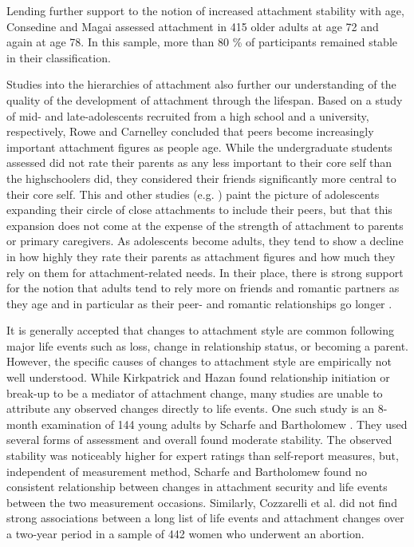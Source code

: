 \documentclass[12pt]{report}
\begin{document}
Lending further support to the notion of increased attachment stability with age, Consedine and Magai assessed attachment in 415 older adults at age 72 and again at age 78. In this sample, more than 80 \% of participants remained stable in their classification.

Studies into the hierarchies of attachment also further our understanding of the quality of the development of attachment through the lifespan.
Based on a study of mid- and late-adolescents recruited from a high school and a university, respectively, Rowe and Carnelley \cite{Rowe2005} concluded that peers become increasingly important attachment figures as people age. While the undergraduate students assessed did not rate their parents as any less important to their core self than the highschoolers did, they considered their friends significantly more central to their core self.
This and other studies (e.g. \cite{Fraley1997,Doherty2004}) paint the picture of adolescents expanding their circle of close attachments to include their peers, but that this expansion does not come at the expense of the strength of attachment to parents or primary caregivers.
As adolescents become adults, they tend to show a decline in how highly they rate their parents as attachment figures and how much they rely on them for attachment-related needs. In their place, there is strong support for the notion that adults tend to rely more on friends and romantic partners as they age and in particular as their peer- and romantic relationships go longer \cite{Tancredy2006,Doherty2004,Fraley1997}.

It is generally accepted that changes to attachment style are common following major life events such as loss, change in relationship status, or becoming a parent. However, the specific causes of changes to attachment style are empirically not well understood. While Kirkpatrick and Hazan \cite{Kirkpatrick1994} found relationship initiation or break-up to be a mediator of attachment change, many studies are unable to attribute any observed changes directly to life events.
One such study is an 8-month examination of 144 young adults by Scharfe and Bartholomew \cite{Scharfe1994}. They used several forms of assessment and overall found moderate stability. The observed stability was noticeably higher for expert ratings than self-report measures, but, independent of measurement method, Scharfe and Bartholomew found no consistent relationship between changes in attachment security and life events between the two measurement occasions.
Similarly, Cozzarelli et al. \cite{Cozzarelli2003} did not find strong associations between a long list of life events and attachment changes over a two-year period in a sample of 442 women who underwent an abortion.
\end{document}
